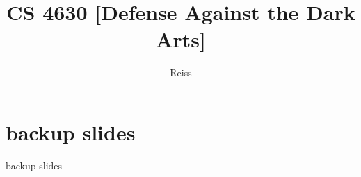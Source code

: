 \date{}
\title{CS 4630 [Defense Against the Dark Arts]}
\author{Reiss}
\date{}

\begin{frame}
    \titlepage
\end{frame}


















\section{backup slides}
\begin{frame}{backup slides}
\end{frame}


